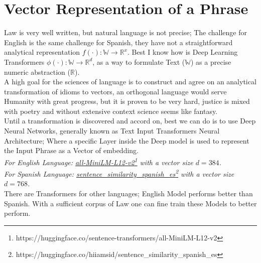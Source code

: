 \documentclass[a4paper,fleqn]{cas-sc}
\begin{document}
\section{Vector Representation of a Phrase}
Law is very well written, but natural language is not precise; The challenge for English is the same challenge for Spanish, 
they have not a straightforward analytical representation $f(\cdot): \mathbb{W}\rightarrow\mathbb{R}^{x}$. 
Best I know how is Deep Learning Transformers $\phi(\cdot): \mathbb{W}\rightarrow\mathbb{R}^{d}$, 
as a way to formulate Text ($\mathbb{W}$) as a precise numeric abstraction ($\mathbb{R}$). \\
A high goal for the sciences of language is to construct and agree on an analytical transformation of idioms to vectors, 
an orthogonal language would serve Humanity with great progress, but it is proven to be very hard, justice is mixed 
with poetry and without extensive context science seems like fantasy. \\

\noindent
Until a transformation is discovered and accord on, best we can do is to use Deep Neural Networks, 
generally known as Text Input Transformers Neural Architecture; Where a specific Layer inside the Deep model 
is used to represent the Input Phrase as a Vector of embedding. \\
\textit{For English Language: \href{https://huggingface.co/sentence-transformers/all-MiniLM-L12-v2}{all-MiniLM-L12-v2}\footnote{https://huggingface.co/sentence-transformers/all-MiniLM-L12-v2} with a vector size $d=384$.}\\
\textit{For Spanish Language: \href{https://huggingface.co/hiiamsid/sentence_similarity_spanish_es}{sentence\_similarity\_spanish\_es}\footnote{https://huggingface.co/hiiamsid/sentence\_similarity\_spanish\_es} with a vector size $d=768$.}\\

There are Transformers for other languages; English Model performs better than Spanish. 
With a sufficient corpus of Law one can fine train these Models to better perform. 
\end{document}

